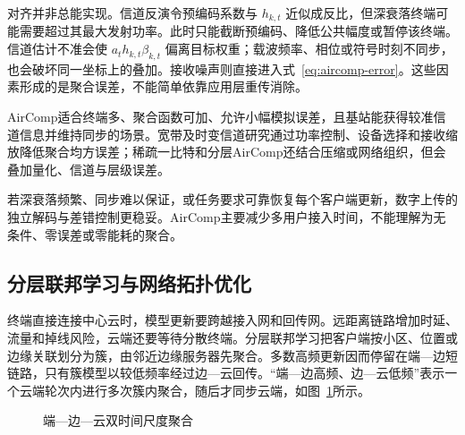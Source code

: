 对齐并非总能实现。信道反演令预编码系数与 \(h_{k,t}\) 近似成反比，但深衰落终端可能需要超过其最大发射功率。此时只能截断预编码、降低公共幅度或暂停该终端。信道估计不准会使 \(a_t h_{k,t}\beta_{k,t}\) 偏离目标权重；载波频率、相位或符号时刻不同步，也会破坏同一坐标上的叠加。接收噪声则直接进入式~\eqref{eq:aircomp-error}。这些因素形成的是聚合误差，不能简单依靠应用层重传消除。

AirComp适合终端多、聚合函数可加、允许小幅模拟误差，且基站能获得较准信道信息并维持同步的场景。宽带及时变信道研究通过功率控制、设备选择和接收缩放降低聚合均方误差；稀疏一比特和分层AirComp还结合压缩或网络组织，但会叠加量化、信道与层级误差\cite{Tegin2023TimeVaryingOTA,Oh2024SparseOneBitOTA,Azimi2024HierarchicalOTA}。

若深衰落频繁、同步难以保证，或任务要求可靠恢复每个客户端更新，数字上传的独立解码与差错控制更稳妥。AirComp主要减少多用户接入时间，不能理解为无条件、零误差或零能耗的聚合。

\subsection{分层联邦学习与网络拓扑优化}\label{subsec:hierarchical-fl}

终端直接连接中心云时，模型更新要跨越接入网和回传网。远距离链路增加时延、流量和掉线风险，云端还要等待分散终端。分层联邦学习把客户端按小区、位置或边缘关联划分为簇，由邻近边缘服务器先聚合。多数高频更新因而停留在端—边短链路，只有簇模型以较低频率经过边—云回传\cite{Liu2020HierarchicalFL,Abad2020HierarchicalCellular}。“端—边高频、边—云低频”表示一个云端轮次内进行多次簇内聚合，随后才同步云端，如图~\ref{fig:hierarchical-aggregation}所示。

\begin{figure}[t]
  \centering
  \resizebox{0.62\textwidth}{!}{}
  \caption{端—边—云双时间尺度聚合\protect\cite{Liu2020HierarchicalFL,Abad2020HierarchicalCellular,Liu2023HierarchicalQuantization}}
  \label{fig:hierarchical-aggregation}
\end{figure}

